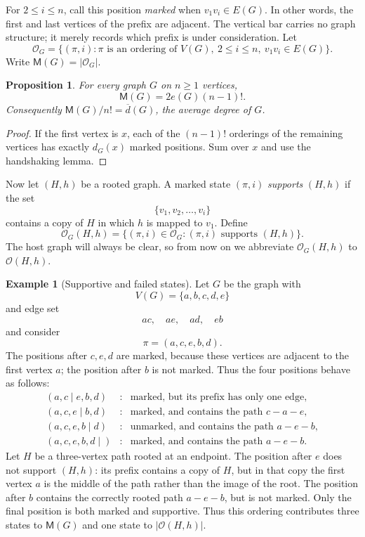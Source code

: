 \documentclass[11pt]{article}
\numberwithin{equation}{section}
\newtheorem{proposition}[theorem]{Proposition}
\theoremstyle{definition}
\newtheorem{example}[theorem]{Example}
\newcommand{\cO}{\mathcal O}
\newcommand{\Mcnt}{\mathsf M}
\newcommand{\avgdeg}{\overline d}
\begin{document}
For $2\leq i\leq n$, call this position \emph{marked} when
$v_1v_i\in E(G)$.  In other words, the first and last vertices of the prefix
are adjacent.  The vertical bar carries no graph structure; it merely records
which prefix is under consideration.  Let
\[
 \cO_G=\{(\pi,i):\pi\text{ is an ordering of }V(G),\ 2\leq i\leq n,
                         \ v_1v_i\in E(G)\}.
\]
Write $\Mcnt(G)=|\cO_G|$.

\begin{proposition}\label{prop:M}
For every graph $G$ on $n\geq1$ vertices,
\[
        \Mcnt(G)=2e(G)(n-1)!.
\]
Consequently $\Mcnt(G)/n!=\avgdeg(G)$, the average degree of $G$.
\end{proposition}

\begin{proof}
If the first vertex is $x$, each of the $(n-1)!$ orderings of the remaining
vertices has exactly $d_G(x)$ marked positions.  Sum over $x$ and use the
handshaking lemma.
\end{proof}

Now let $(H,h)$ be a rooted graph.  A marked state $(\pi,i)$ \emph{supports}
$(H,h)$ if the set
\[
        \{v_1,v_2,\ldots,v_i\}
\]
contains a copy of $H$ in which $h$ is mapped to $v_1$.  Define
\[
 \cO_G(H,h)=\{(\pi,i)\in\cO_G:(\pi,i)\text{ supports }(H,h)\}.
\]
The host graph will always be clear, so from now on we abbreviate
$\cO_G(H,h)$ to $\cO(H,h)$.

\begin{example}[Supportive and failed states]\label{ex:marked}
Let $G$ be the graph with
\[
        V(G)=\{a,b,c,d,e\}
\]
and edge set
\[
        ac,\quad ae,\quad ad,\quad eb
\]
and consider
\[
        \pi=(a,c,e,b,d).
\]
The positions after $c,e,d$ are marked, because these vertices are adjacent
to the first vertex $a$; the position after $b$ is not marked.  Thus the
four positions behave as follows:
\[
\begin{array}{ccl}
 (a,c\mid e,b,d)     &:& \text{marked, but its prefix has only one edge},\\
 (a,c,e\mid b,d)     &:& \text{marked, and contains the path $c-a-e$},\\
 (a,c,e,b\mid d)     &:& \text{unmarked, and contains the path $a-e-b$},\\
 (a,c,e,b,d\mid)     &:& \text{marked, and contains the path $a-e-b$}.
\end{array}
\]
Let $H$ be a three-vertex path rooted at an endpoint.  The position after $e$
does not support $(H,h)$: its prefix contains a copy of $H$, but in that
copy the first vertex $a$ is the middle of the path rather than the image of
the root.  The position after $b$ contains the correctly rooted path
$a-e-b$, but is not marked.  Only the final position is both marked and
supportive.
Thus this ordering contributes three states to $\Mcnt(G)$ and one state to
$|\cO(H,h)|$.
\end{example}
\end{document}
